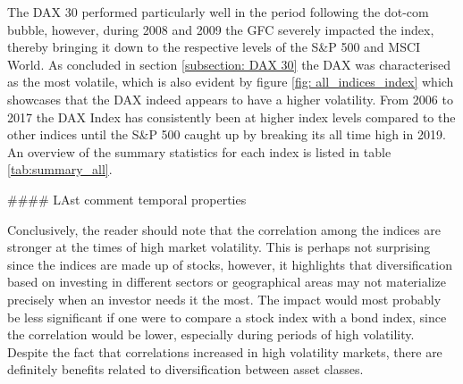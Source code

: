The DAX 30 performed particularly well in the period following the dot-com bubble, however, during 2008 and 2009 the GFC severely impacted the index, thereby bringing it down to the respective levels of the S\&P 500 and MSCI World. As concluded in section \ref{subsection: DAX 30} the DAX was characterised as the most volatile, which is also evident by figure \ref{fig: all_indices_index} which showcases that the DAX indeed appears to have a higher volatility. From 2006 to 2017 the DAX Index has consistently been at higher index levels compared to the other indices until the S\&P 500 caught up by breaking its all time high in 2019. An overview of the summary statistics for each index is listed in table \ref{tab:summary_all}.

#### LAst comment temporal properties

Conclusively, the reader should note that the correlation among the indices are stronger at the times of high market volatility. This is perhaps not surprising since the indices are made up of stocks, however, it highlights that diversification based on investing in different sectors or geographical areas may not materialize precisely when an investor needs it the most. The impact would most probably be less significant if one were to compare a stock index with a bond index, since the correlation would be lower, especially during periods of high volatility. Despite the fact that correlations increased in high volatility markets, there are definitely benefits related to diversification between asset classes.